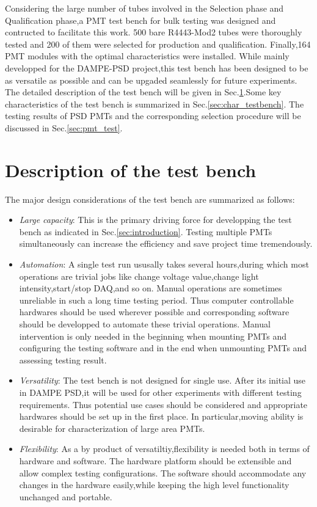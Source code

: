 \documentclass[preprint,5p,times]{elsarticle}
\begin{document}
Considering the large number of tubes involved in the Selection phase and Qualification phase,a PMT test bench for bulk testing was designed and contructed to facilitate this work.
500 bare R4443-Mod2 tubes were thoroughly tested and 200 of them were selected for production and qualification.
Finally,164 PMT modules with the optimal characteristics were installed.
While mainly developped for the DAMPE-PSD project,this test bench has been designed to be as versatile as possible and can be upgaded seamlessly for future experiments.
The detailed description of the test bench will be given in Sec.\ref{sec:description}.Some key characteristics of the test bench is summarized in Sec.\ref{sec:char_testbench}.
The testing results of PSD PMTs and the corresponding selection procedure will be discussed in Sec.\ref{sec:pmt_test}.

\section{Description of the test bench}
\label{sec:description}

The major design considerations of the test bench are summarized as follows:
\begin{itemize}
 \item \textit{Large capacity}: This is the primary driving force for developping the test bench as indicated in Sec.\ref{sec:introduction}.
 Testing multiple PMTs simultaneously can increase the efficiency and save project time tremendously. 
 \item \textit{Automation}: A single test run ususally takes several hours,during which most operations are trivial jobs like change voltage value,change light intensity,start/stop DAQ,and so on.
 Manual operations are sometimes unreliable in such a long time testing period.
 Thus computer controllable hardwares should be used wherever possible and corresponding software should be developped to automate these trivial operations.
 Manual intervention is only needed in the beginning when mounting PMTs and configuring the testing software and in the end when unmounting PMTs and assessing testing result. 
 \item \textit{Versatility}: The test bench is not designed for single use.
 After its initial use in DAMPE PSD,it will be used for other experiments with different testing requirements.
 Thus potential use cases should be considered and appropriate hardwares should be set up in the first place.
 In particular,moving ability is desirable for characterization of large area PMTs. 
 \item \textit{Flexibility}: As a by product of versatiltiy,flexibility is needed both in terms of hardware and software.
 The hardware platform should be extensible and allow complex testing configurations.
 The software should accommodate any changes in the hardware easily,while keeping the high level functionality unchanged and portable. 
\end{itemize}
\end{document}
